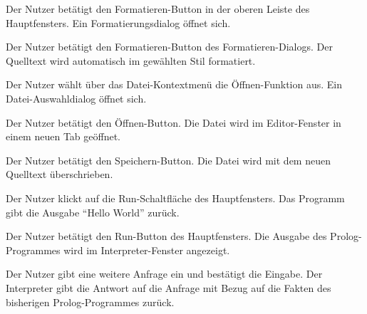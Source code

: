 \documentclass[parskip=full,11pt,twoside]{scrartcl}
\begin{document}


{Der Nutzer betätigt den Formatieren-Button in der oberen Leiste des Hauptfensters.}
{Ein Formatierungsdialog öffnet sich.}

{Der Nutzer betätigt den Formatieren-Button des Formatieren-Dialogs.}
{Der Quelltext wird automatisch im gewählten Stil formatiert.}



{Der Nutzer wählt über das Datei-Kontextmenü die Öffnen-Funktion aus.}
{Ein Datei-Auswahldialog öffnet sich.}

{Der Nutzer betätigt den Öffnen-Button.}
{Die Datei wird im Editor-Fenster in einem neuen Tab geöffnet.}

{Der Nutzer betätigt den Speichern-Button.}
{Die Datei wird mit dem neuen Quelltext überschrieben.}



{Der Nutzer klickt auf die Run-Schaltfläche des Hauptfensters.}
{Das Programm gibt die Ausgabe \enquote{Hello World} zurück.}



{Der Nutzer betätigt den Run-Button des Hauptfensters.}
{Die Ausgabe des Prolog-Programmes wird im Interpreter-Fenster angezeigt.}

{Der Nutzer gibt eine weitere Anfrage ein und bestätigt die Eingabe.}
{Der Interpreter gibt die Antwort auf die Anfrage mit Bezug auf die Fakten des bisherigen Prolog-Programmes zurück.}
\end{document}
